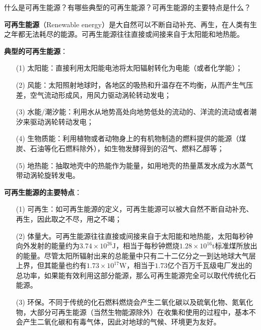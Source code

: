 \documentclass{assignment}
\begin{document}
\begin{ti}
    什么是可再生能源？有哪些典型的可再生能源？可再生能源的主要特点是什么？
\end{ti}
\begin{da}
    \textbf{可再生能源}（Renewable energy）是大自然可以不断自动补充、再生，在人类有生之年都无法耗尽的能源。可再生能源往往直接或间接来自于太阳能和地热能。

    \noindent\textbf{典型的可再生能源}：
    \begin{itemize}
        \item[(1)] 太阳能：直接利用太阳能电池将太阳辐射转化为电能（或者化学能）；
        \item[(2)] 风能：太阳照射地球时，各地区的吸热和升温存在不均衡，从而产生气压差，空气流动形成风，用风力驱动涡轮转动发电；
        \item[(3)] 水能/潮汐能：利用水从地势高处向地势低处的流动的、洋流的流动或者潮汐来驱动涡轮转动发电；
        \item[(4)] 生物质能：利用植物或者动物身上的有机物制造的燃料提供的能源（煤炭、石油等化石燃料除外），如生物发酵得到的沼气、燃料乙醇等；
        \item[(5)] 地热能：抽取地壳中的热能作为能量，如用地壳的热量蒸发水成为水蒸气带动涡轮旋转发电。
    \end{itemize}

    \noindent\textbf{可再生能源的主要特点}：
    \begin{itemize}
        \item[(1)] 可再生：如可再生能源的定义，可再生能源可以被大自然不断自动补充、再生，因此取之不尽，用之不竭；
        \item[(2)] 体量大。可再生能源往往直接或间接来自于太阳能和地热能，太阳每秒钟向外发射的能量约为$3.74\times 10^{26}\mathrm{J}$，相当于每秒钟燃烧$1.28\times 10^{16}\mathrm{t}$标准煤所放出的能量。尽管太阳所辐射出来的总能量中只有二十二亿分之一到达地球大气层上界，但其能量也约有$1.73\times 10^{17}\mathrm{W}$，相当于$1.73$亿个百万千瓦级电厂发出的总功率，如果能有效利用这部分能源，那么可再生能源完全可以取代传统化石能源。
        \item[(3)] 环保。不同于传统的化石燃料燃烧会产生二氧化碳以及硫氧化物、氮氧化物，大部分可再生能源（当然生物能源除外）在收集和使用的过程中，基本不会产生二氧化碳和有毒气体，因此对地球的气候、环境更为友好。
    \end{itemize}
\end{da}
\end{document}
